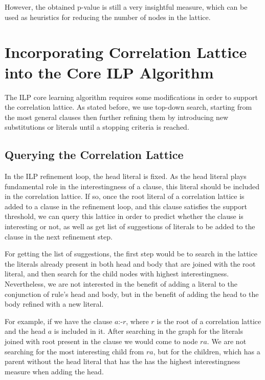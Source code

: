 However, the obtained p-value is still a very insightful measure, which can be used as heuristics for reducing the
number of nodes in the lattice.

\section{Incorporating Correlation Lattice into the Core ILP Algorithm}
\label{sec:incorporation}

The ILP core learning algorithm requires some modifications in order to support the correlation lattice. As stated
before, we use top-down search, starting from the most general clauses then further refining them by introducing
new substitutions or literals until a stopping criteria is reached.

\subsection{Querying the Correlation Lattice}
\label{sec:queryingTheLattice}

In the ILP refinement loop, the head literal is fixed. As the head literal plays fundamental role in the
interestingness of a clause, this literal should be included in the correlation lattice. If so, once the root literal
of a correlation lattice is added to a clause in the refinement loop, and this clause satisfies the support threshold,
we can query this lattice in order to predict whether the clause is interesting or not, as well as get list of
suggestions of literals to be added to the clause in the next refinement step.

For getting the list of suggestions, the first step would be to search in the lattice the literals already present in
both head and body that are joined with the root literal, and then search for the child nodes with
highest interestingness. Nevertheless, we are not interested in the benefit of adding a literal to the conjunction
of rule's head and body, but in the benefit of adding the head to the body refined with a new literal.

For example, if we have the clause $a$:-$r$, where $r$ is the root of a correlation lattice and the head $a$ is included
in it. After searching in the graph for the literals joined with root present in the clause we would come to node
$ra$. We are not searching for the most interesting child from $ra$, but for the children, which has a parent without
the head literal that has the has the highest interestingness measure when adding the head.


